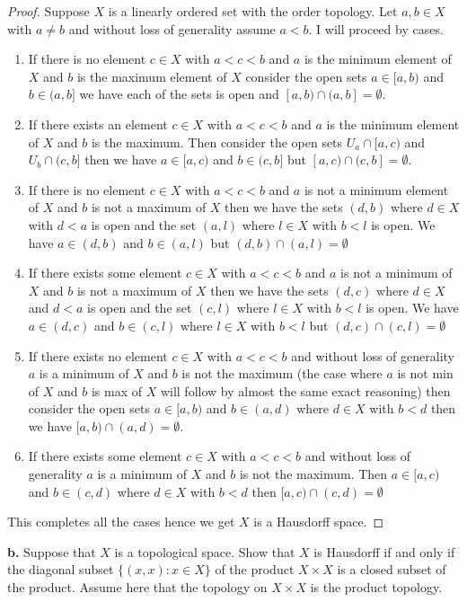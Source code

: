 \documentclass{amsart}
\theoremstyle{plain}
\theoremstyle{definition}
\theoremstyle{remark}
\begin{document}
\begin{proof}
    Suppose $X$ is a linearly ordered set with the order topology. Let $a,b\in X$ with $a\not = b$ and without loss of generality assume $a<b$. I will proceed by cases. 
    \begin{enumerate}
        \item If there is no element $c\in X$ with $a<c<b$ and $a$ is the minimum element of $X$ and $b$ is the maximum element of $X$ consider the open sets $a\in [a,b)$ and $b\in (a,b]$ we have each of the sets is open and $ [a,b)\cap  (a,b]=\emptyset$. 
        \item If there exists an element $c\in X$ with $a<c<b$ and $a$ is the minimum element of $X$ and $b$ is the maximum. Then consider the open sets $U_a\cap [a,c)$ and $U_b\cap (c,b]$ then we have $a\in  [a,c)$ and $b\in  (c,b]$ but $[a,c)\cap (c,b]=\emptyset$.
        \item If there is no element $c\in X$ with $a<c<b$ and $a$ is not a minimum element of $X$ and $b$ is not a maximum of $X$ then we have the sets $(d,b)$ where $d\in X$ with $d<a$ is open and the set $(a,l)$ where $l\in X$ with $b<l$ is open. We have $a\in  (d,b)$ and $b\in  (a,l)$ but $(d,b)\cap  (a,l)=\emptyset $
        \item If there exists some element $c\in X$ with $a<c<b$ and $a$ is not a minimum of $X$ and $b$ is not a maximum of $X$ then we have the sets $(d,c)$ where $d\in X$ and $d<a$ is open and the set $(c,l)$ where $l\in X$ with $b<l$ is open. We have $a\in(d,c)$ and $b\in (c,l)$ where $l\in X$ with $b<l$ but $ (d,c) \cap (c,l)=\emptyset$
        \item If there exists no element $c\in X$ with $a<c<b$ and without loss of generality $a$ is a minimum of $X$ and $b$ is not the maximum (the case where $a$ is not min of $X$ and $b$ is max of $X$ will follow by almost the same exact reasoning) then consider the open sets $a\in  [a,b)$ and $b\in  (a,d)$ where $d\in X$ with $b<d$ then we have $ [a,b) \cap (a,d)=\emptyset$.
        \item If there exists some element $c\in X$ with $a<c<b$ and without loss of generality $a$ is a minimum of $X$ and $b$ is not the maximum. Then $a\in  [a,c)$ and $b\in  (c,d)$ where $d\in X$ with $b<d$ then $[a,c) \cap (c,d)=\emptyset$ 
    \end{enumerate} 
    This completes all the cases hence we get $X$ is a Hausdorff space.
\end{proof}


{\bf b.} Suppose that $X$ is a topological space. Show that $X$ is Hausdorff if and only if the diagonal subset $\{ (x , x ) : x\in X\}$ of the product $X\times X$ is a closed subset of the product. Assume here that the topology on $X\times X$ is the product topology.
\end{document}
